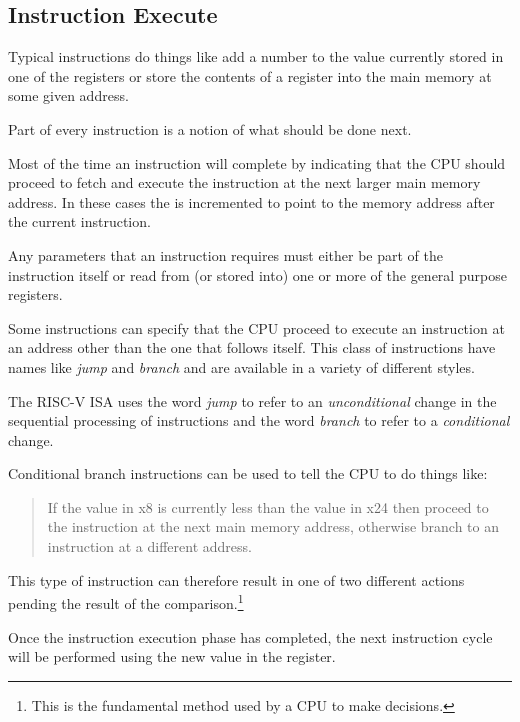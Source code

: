 \subsection{Instruction Execute}

Typical instructions do things like add a number to the value
currently stored in one of the registers or store the contents of a
register into the main memory at some given address.

Part of every instruction is a notion of what should be done next.

Most of the time an instruction will complete by indicating that
the CPU should proceed to fetch and execute the instruction at the next
larger main memory address.  In these cases the  is incremented
to point to the memory address after the current instruction.

Any parameters that an instruction requires must either be part of
the instruction itself or read from (or stored into) one or more of the
general purpose registers.

Some instructions can specify that the CPU proceed to execute an
instruction at an address other than the one that follows itself.
This class of instructions have names like {\em jump} and {\em branch}
and are available in a variety of different styles.

The RISC-V ISA uses the word {\em jump} to refer to an {\em unconditional}
change in the sequential processing of instructions and the word
{\em branch} to refer to a {\em conditional} change.

Conditional branch instructions can be used to tell the CPU to
do things like:

\begin{quote}
If the value in x8 is currently less than the value in x24 then
proceed to the instruction at the next main memory address, otherwise
branch to an instruction at a different address.
\end{quote}

This type of instruction can therefore result in one of two different
actions pending the result of the
comparison.\footnote{This is the fundamental method used by a CPU
to make decisions.}

Once the instruction execution phase has completed, the next instruction
cycle will be performed using the new value in the  register.